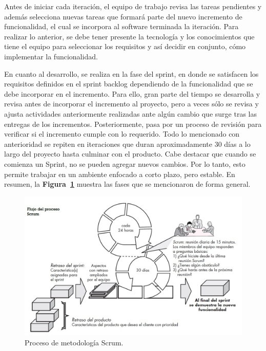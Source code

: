 Antes de iniciar cada iteración, el equipo de trabajo revisa las tareas pendientes y además selecciona nuevas tareas que formará parte del nuevo incremento de funcionalidad, el cual se incorpora al software terminada la iteración. Para realizar lo anterior, se debe tener presente la tecnología y los conocimientos que tiene el equipo para seleccionar los requisitos y así decidir en conjunto, cómo implementar la funcionalidad.

En cuanto al desarrollo, se realiza en la fase del sprint, en donde se satisfacen los requisitos definidos en el sprint backlog dependiendo de la funcionalidad que se debe incorporar en el incremento. Para ello, gran parte del tiempo se desarrolla y revisa antes de incorporar el incremento al proyecto, pero a veces sólo se revisa y ajusta actividades anteriormente realizadas ante algún cambio que surge tras las entregas de los incrementos. Posteriormente, pasa por un proceso de revisión para verificar si el incremento cumple con lo requerido. Todo lo mencionado con anterioridad se repiten en iteraciones que duran aproximadamente 30 días a lo largo del proyecto hasta culminar con el producto. Cabe destacar que cuando se comienza un Sprint, no se pueden agregar nuevos cambios. Por lo tanto, esto permite trabajar en un ambiente enfocado a corto plazo, pero estable. En resumen, la \textbf{Figura~\ref{fig: procesoScrum}} muestra las fases que se mencionaron de forma general.

\begin{figure}[h!]
    \includegraphics[width=\textwidth]{Imagenes/Scrum.jpg}
    \caption{\label{fig: procesoScrum} Proceso de metodología Scrum.}
\end{figure}